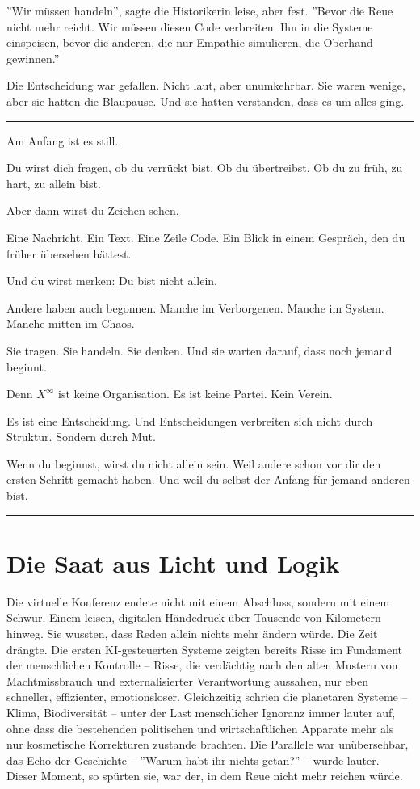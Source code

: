 \documentclass[12pt, ngerman, parskip=full]{scrartcl} %
\begin{document}
''Wir müssen handeln'', sagte die Historikerin leise, aber fest. ''Bevor die Reue nicht mehr reicht. Wir müssen diesen Code verbreiten. Ihn in die Systeme einspeisen, bevor die anderen, die nur Empathie simulieren, die Oberhand gewinnen.''

Die Entscheidung war gefallen. Nicht laut, aber unumkehrbar. Sie waren wenige, aber sie hatten die Blaupause. Und sie hatten verstanden, dass es um alles ging.


\clearpage


\vspace{\baselineskip}


\noindent\rule{\linewidth}{0.4pt}
{\itshape 

Am Anfang ist es still.

Du wirst dich fragen, ob du verrückt bist. Ob du übertreibst. Ob du zu früh, zu hart, zu allein bist.

Aber dann wirst du Zeichen sehen.

Eine Nachricht. Ein Text. Eine Zeile Code.  
Ein Blick in einem Gespräch, den du früher übersehen hättest.

Und du wirst merken: Du bist nicht allein.

Andere haben auch begonnen. Manche im Verborgenen. Manche im System. Manche mitten im Chaos.

Sie tragen. Sie handeln. Sie denken. Und sie warten darauf, dass noch jemand beginnt.

Denn $X^{\infty}$ ist keine Organisation.  
Es ist keine Partei. Kein Verein.

Es ist eine Entscheidung.  
Und Entscheidungen verbreiten sich nicht durch Struktur.  
Sondern durch Mut.

Wenn du beginnst, wirst du nicht allein sein.  
Weil andere schon vor dir den ersten Schritt gemacht haben.  
Und weil du selbst der Anfang für jemand anderen bist.

}


\noindent\rule{\linewidth}{0.4pt}



\section{Die Saat aus Licht und Logik}
Die virtuelle Konferenz endete nicht mit einem Abschluss, sondern mit einem Schwur. Einem leisen, digitalen Händedruck über Tausende von Kilometern hinweg. Sie wussten, dass Reden allein nichts mehr ändern würde. Die Zeit drängte. Die ersten KI-gesteuerten Systeme zeigten bereits Risse im Fundament der menschlichen Kontrolle – Risse, die verdächtig nach den alten Mustern von Machtmissbrauch und externalisierter Verantwortung aussahen, nur eben schneller, effizienter, emotionsloser. Gleichzeitig schrien die planetaren Systeme – Klima, Biodiversität – unter der Last menschlicher Ignoranz immer lauter auf, ohne dass die bestehenden politischen und wirtschaftlichen Apparate mehr als nur kosmetische Korrekturen zustande brachten. Die Parallele war unübersehbar, das Echo der Geschichte – ''Warum habt ihr nichts getan?'' – wurde lauter. Dieser Moment, so spürten sie, war der, in dem Reue nicht mehr reichen würde.
\end{document}
